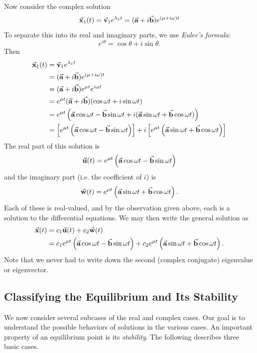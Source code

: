 Now consider the complex solution
\begin{equation}
  \vec{\textbf{x}}_1(t) = \vec{\textbf{v}}_1 e^{\lambda_1 t}
    = (\vec{\textbf{a}}+i\vec{\textbf{b}}) e^{(\mu + i\omega)t}
\end{equation}
To separate this into its real and imaginary parts, we use
\emph{Euler's formula}:
\begin{equation}
e^{i\theta} = \cos\theta + i \sin\theta.
\end{equation}
Then
\begin{equation}
\begin{split}
  \vec{\textbf{x}}_1(t) & = \vec{\textbf{v}}_1 e^{\lambda_1 t} \\
     & = (\vec{\textbf{a}}+i\vec{\textbf{b}}) e^{(\mu + i\omega)t} \\
     & = (\vec{\textbf{a}}+i\vec{\textbf{b}})e^{\mu t} e^{i\omega t} \\
     & = e^{\mu t} (\vec{\textbf{a}}+i\vec{\textbf{b}})(\cos \omega t + i\sin \omega t) \\
     & = e^{\mu t} \left(\vec{\textbf{a}}\cos\omega t - \vec{\textbf{b}}\sin\omega t + i(\vec{\textbf{a}}\sin\omega t + \vec{\textbf{b}}\cos\omega t)\right) \\
     & = \left[e^{\mu t}\left(\vec{\textbf{a}}\cos\omega t - \vec{\textbf{b}}\sin\omega t \right) \right]
         + i \left[e^{\mu t}\left(\vec{\textbf{a}}\sin\omega t + \vec{\textbf{b}}\cos\omega t\right) \right]
\end{split} 
\end{equation}
The real part of this solution is
\begin{equation} 
\vec{\textbf{u}}(t) = e^{\mu t}\left(\vec{\textbf{a}}\cos\omega t - \vec{\textbf{b}}\sin\omega t \right)
\end{equation}
and the imaginary part (i.e. the coefficient of $i$) is
\begin{equation}
\vec{\textbf{w}}(t) = e^{\mu t}\left(\vec{\textbf{a}}\sin\omega t + \vec{\textbf{b}}\cos\omega t\right).
\end{equation}
Each of these is real-valued, and by the observation given
above, each is a solution to the differential equations.
We may then write the general solution as
\begin{equation}
\begin{split}
   \vec{\textbf{x}}(t) & = c_1 \vec{\textbf{u}}(t) + c_2 \vec{\textbf{w}}(t) \\
    &  =  c_1 e^{\mu t}\left(\vec{\textbf{a}}\cos\omega t - \vec{\textbf{b}}\sin\omega t \right)
                 + c_2 e^{\mu t}\left(\vec{\textbf{a}}\sin\omega t + \vec{\textbf{b}}\cos\omega t\right).
\end{split}
\label{eqn:gensolcomplex}
\end{equation}
Note that we never had to write down the second (complex conjugate)
eigenvalue or eigenvector. 

\subsection*{Classifying the Equilibrium and Its Stability}
We now consider several subcases of the real and complex cases.
Our goal is to understand the possible behaviors of solutions
in the various cases.
An important property of an equilibrium point is its
\emph{stability}.
The following describes three basic cases.

